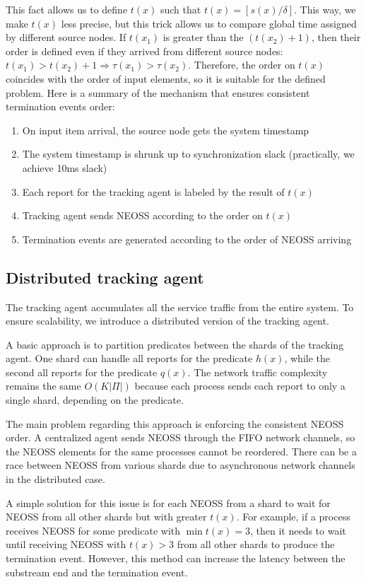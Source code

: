 This fact allows us to define $t(x)$ such that $t(x) = [s(x) / \delta]$. This way, we make $t(x)$ less precise, but this trick allows us to compare global time assigned by different source nodes. If $t(x_1)$ is greater than the $(t(x_2) + 1)$, then their order is defined even if they arrived from different source nodes:  $t(x_1) > t(x_2) + 1 \Rightarrow \tau(x_1) > \tau(x_2)$. Therefore, the order on $t(x)$ coincides with the order of input elements, so it is suitable for the defined problem. Here is a summary of the mechanism that ensures consistent termination events order:
\begin{enumerate}
    \item On input item arrival, the source node gets the system timestamp
    \item The system timestamp is shrunk up to synchronization slack (practically, we achieve 10ms slack)
    \item Each report for the tracking agent is labeled by the result of $t(x)$
    \item Tracking agent sends NEOSS according to the order on $t(x)$
    \item Termination events are generated according to the order of NEOSS arriving
\end{enumerate}

\subsection{Distributed tracking agent}

The tracking agent accumulates all the service traffic from the entire system. To ensure scalability, we introduce a distributed version of the tracking agent.

A basic approach is to partition predicates between the shards of the tracking agent. One shard can handle all reports for the predicate $h(x)$, while the second all reports for the predicate $q(x)$. The network traffic complexity remains the same $O(K|\Pi|)$ because each process sends each report to only a single shard, depending on the predicate.

The main problem regarding this approach is enforcing the consistent NEOSS order. A centralized agent sends NEOSS through the FIFO network channels, so the NEOSS elements for the same processes cannot be reordered. There can be a race between NEOSS from various shards due to asynchronous network channels in the distributed case.

A simple solution for this issue is for each NEOSS from a shard to wait for NEOSS from all other shards but with greater $t(x)$. For example, if a process receives NEOSS for some predicate with $\min t(x) = 3$, then it needs to wait until receiving NEOSS with $t(x) > 3$ from all other shards to produce the termination event. However, this method can increase the latency between the substream end and the termination event.

